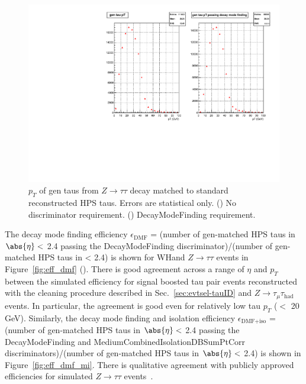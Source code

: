 \begin{figure}[hbtp]
  \begin{center}
    \includegraphics[width=\cmsFigWidth]{figures/gentau_pt_ztt_dmf}
    \caption{$p_T$ of gen taus from $Z\rightarrow\tau\tau$ decay matched to standard reconstructed HPS taus.  Errors are statistical only.  (\cmsLeft) No discriminator requirement.  (\cmsRight) DecayModeFinding requirement.}
    \label{fig:gen_ztt}
  \end{center}
\end{figure}

The decay mode finding efficiency $\epsilon_{\text{DMF}}$ = (number of gen-matched HPS taus in $\abs{\eta} <$ 2.4 passing the DecayModeFinding discriminator)/(number of gen-matched HPS taus in \abs{\eta} \textless\xspace 2.4) is shown for WHand $Z\rightarrow\tau\tau$ events in Figure~\ref{fig:eff_dmf} (\cmsLeft).  There is good agreement across a range of $\eta$ and $p_T$ between the simulated efficiency for signal boosted tau pair events reconstructed with the cleaning procedure described in Sec.~\ref{sec:evtsel-tauID} and $Z\rightarrow\tau_{\mu}\tau_{\text{had}}$ events.  In particular, the agreement is good even for relatively low tau $p_T$ ($<$ 20 GeV).  Similarly, the decay mode finding and isolation efficiency $\epsilon_{\text{DMF+iso}}$ = (number of gen-matched HPS taus in $\abs{\eta} <$ 2.4 passing the DecayModeFinding and MediumCombinedIsolationDBSumPtCorr discriminators)/(number of gen-matched HPS taus in $\abs{\eta} <$ 2.4) is shown in Figure~\ref{fig:eff_dmf_mi}. There is qualitative agreement with publicly approved efficiencies for simulated $Z\rightarrow\tau\tau$ events~\cite{CMS:approvedTAUResults}.

